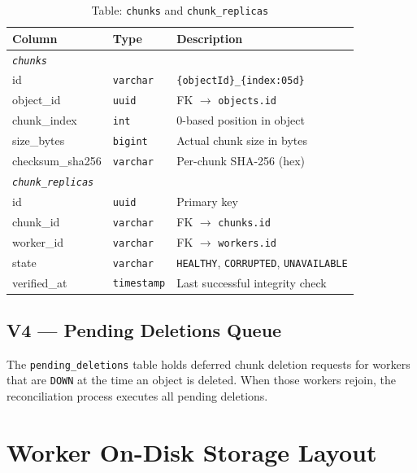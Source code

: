 \documentclass[12pt,a4paper]{report}
\begin{document}
\begin{table}[H]
  \centering
  \caption{Table: \texttt{chunks} and \texttt{chunk\_replicas}}
  \label{tab:chunks}
  \begin{tabular}{lll}
    \toprule
    \textbf{Column}      & \textbf{Type}    & \textbf{Description} \\
    \midrule
    \multicolumn{3}{l}{\textit{\texttt{chunks}}} \\
    id                   & \texttt{varchar} & \texttt{\{objectId\}\_\{index:05d\}} \\
    object\_id           & \texttt{uuid}    & FK $\rightarrow$ \texttt{objects.id} \\
    chunk\_index         & \texttt{int}     & 0-based position in object \\
    size\_bytes          & \texttt{bigint}  & Actual chunk size in bytes \\
    checksum\_sha256     & \texttt{varchar} & Per-chunk SHA-256 (hex) \\
    \midrule
    \multicolumn{3}{l}{\textit{\texttt{chunk\_replicas}}} \\
    id                   & \texttt{uuid}    & Primary key \\
    chunk\_id            & \texttt{varchar} & FK $\rightarrow$ \texttt{chunks.id} \\
    worker\_id           & \texttt{varchar} & FK $\rightarrow$ \texttt{workers.id} \\
    state                & \texttt{varchar} & \texttt{HEALTHY}, \texttt{CORRUPTED}, \texttt{UNAVAILABLE} \\
    verified\_at         & \texttt{timestamp} & Last successful integrity check \\
    \bottomrule
  \end{tabular}
\end{table}

\subsection{V4 --- Pending Deletions Queue}

The \texttt{pending\_deletions} table holds deferred chunk deletion requests for workers that are \texttt{DOWN} at the time an object is deleted. When those workers rejoin, the reconciliation process executes all pending deletions.

\section{Worker On-Disk Storage Layout}
\end{document}
